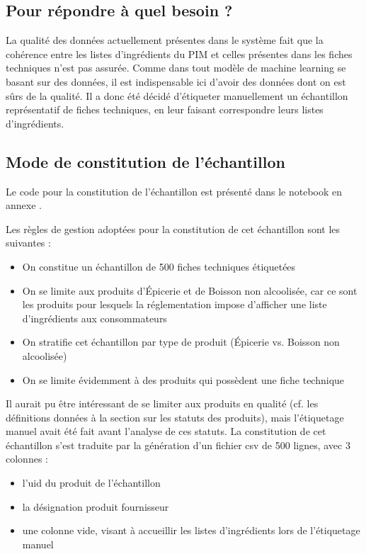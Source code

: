             \subsection{Pour répondre à quel besoin ?}

            La qualité des données actuellement présentes dans le système fait que la cohérence entre les listes d'ingrédients du PIM et celles présentes dans les fiches techniques n'est pas assurée.
            Comme dans tout modèle de machine learning se basant sur des données, il est indispensable ici d'avoir des données dont on est sûrs de la qualité.
            Il a donc été décidé d'étiqueter manuellement un échantillon représentatif de fiches techniques, en leur faisant correspondre leurs listes d'ingrédients.

            \subsection{Mode de constitution de l'échantillon}
            
            Le code pour la constitution de l'échantillon est présenté dans le notebook en annexe .

            Les règles de gestion adoptées pour la constitution de cet échantillon sont les suivantes :
            \begin{itemize}
                \item On constitue un échantillon de 500 fiches techniques étiquetées
                \item On se limite aux produits d'\'{E}picerie et de Boisson non alcoolisée, car ce sont les produits pour lesquels la réglementation impose d'afficher une liste d'ingrédients aux consommateurs
                \item On stratifie cet échantillon par type de produit (\'{E}picerie vs. Boisson non alcoolisée)
                \item On se limite évidemment à des produits qui possèdent une fiche technique
            \end{itemize}
            Il aurait pu être intéressant de se limiter aux produits \og en qualité \fg (cf. les définitions données à la section  sur les statuts des produits), mais l'étiquetage manuel avait été fait avant l'analyse de ces statuts.
            La constitution de cet échantillon s'est traduite par la génération d'un fichier csv de 500 lignes, avec 3 colonnes : 
            \begin{itemize}
                \item l'uid du produit de l'échantillon
                \item la désignation produit fournisseur
                \item une colonne vide, visant à accueillir les listes d'ingrédients lors de l'étiquetage manuel
            \end{itemize}

